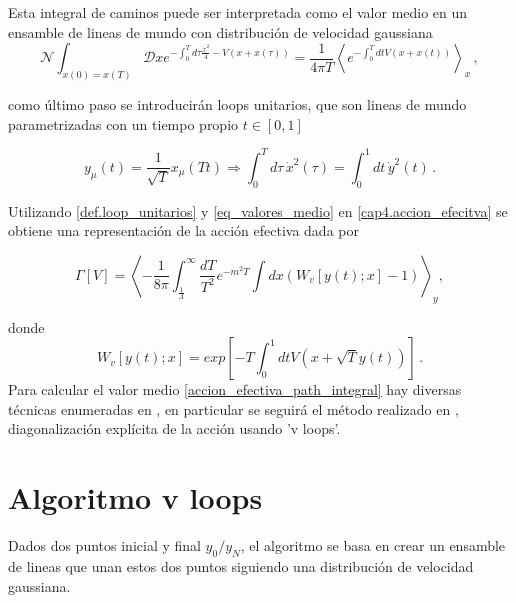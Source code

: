 Esta integral de caminos puede ser interpretada como el valor medio en un ensamble de lineas de mundo con distribución de velocidad gaussiana
\begin{equation}
\mathcal{N} 
\int _{x(0) = x(T)} \mathscr D x e ^{- \int _0 ^T d \tau \frac{\dot{x} ^2}{4} - V(x + x( \tau )) } =
\frac{1}{4 \pi T} \left<  e ^{- \int _0 ^T dt   V(x + x(t)) }  \right> _{x}
\, ,
\label{eq_valores_medio}
\end{equation}

como último paso se introducirán loops unitarios, que son lineas de mundo parametrizadas con un tiempo propio $t \in [0,1]$

\begin{equation}
y _{\mu} (t) = \frac{1}{\sqrt{T}} x _{\mu} (T t)
\Longrightarrow
\int _{0} ^{T} d \tau \, \dot{x  } ^2 ( \tau) = \int _{0} ^{1} dt \, \dot{y } ^2 ( t)
\, .
\label{def.loop_unitarios}
\end{equation}

Utilizando \eqref{def.loop_unitarios} y  \eqref{eq_valores_medio} en \eqref{cap4.accion_efecitva} se obtiene una representación de la acción efectiva dada por

\begin{equation}
\Gamma \left[ V \right] = 
\left<
-  \frac{1}{8 \pi}
\int _{\frac{1}{\Lambda}} ^{\infty} \frac{dT}{T^ {2}} e ^{- m^2 T}
\int dx \left( W _v [ y(t); x] - 1\right)
\right> _{y} 
 ,
\label{accion_efectiva_path_integral}
\end{equation}


donde
\begin{equation}
W _v [ y(t); x] = exp \left[ -T \int _{0} ^{1} dt V( x + \sqrt{T} y(t)) \right]
\, .
\label{eq.definicion_w}
\end{equation}
Para calcular el valor medio \eqref{accion_efectiva_path_integral} hay diversas técnicas enumeradas en \cite{Gies_2003}, en particular se seguirá el método realizado en \cite{Franchino_Vi_as_2019}, diagonalización explícita de la acción usando 'v loops'.



\section{Algoritmo v loops}


Dados dos puntos inicial y final $ y_0 / y_N$, el algoritmo se basa en crear un ensamble de lineas que unan estos dos puntos siguiendo una distribución de velocidad gaussiana.
 


